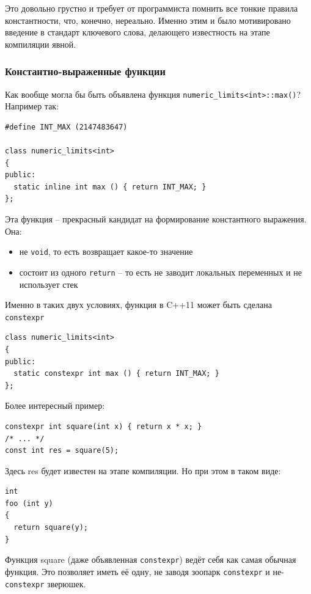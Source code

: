 \documentclass[a4paper,12pt,oneside]{article}
\begin{document}
Это довольно грустно и требует от программиста помнить все тонкие правила константности, что, конечно, нереально. Именно этим и было мотивировано введение в стандарт ключевого слова, делающего известность на этапе компиляции явной.

\subsubsection{Константно-выраженные функции}

Как вообще могла бы быть объявлена функция \lstinline!numeric_limits<int>::max()!? Например так:

\begin{lstlisting}
#define INT_MAX (2147483647)

class numeric_limits<int>
{
public:
  static inline int max () { return INT_MAX; }
};
\end{lstlisting}

Эта функция -- прекрасный кандидат на формирование константного выражения. Она:
\begin{itemize}
\item не \lstinline!void!, то есть возвращает какое-то значение
\item состоит из одного \lstinline!return! -- то есть не заводит локальных переменных и не использует стек
\end{itemize}

Именно в таких двух условиях, функция в C++11 может быть сделана \lstinline!constexpr!

\begin{lstlisting}
class numeric_limits<int>
{
public:
  static constexpr int max () { return INT_MAX; }
};
\end{lstlisting}

Более интересный пример:

\begin{lstlisting}
constexpr int square(int x) { return x * x; }
/* ... */
const int res = square(5);
\end{lstlisting}

Здесь res будет известен на этапе компиляции. Но при этом в таком виде:

\begin{lstlisting}
int
foo (int y)
{
  return square(y);
}
\end{lstlisting}

Функция square (даже объявленная \lstinline!constexpr!) ведёт себя как самая обычная функция. Это позволяет иметь её одну, не заводя зоопарк \lstinline!constexpr! и не-\lstinline!constexpr! зверюшек.
\end{document}
